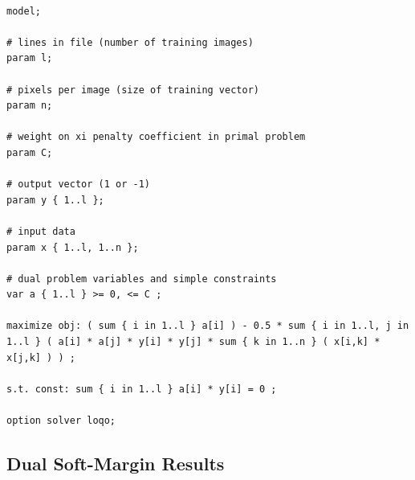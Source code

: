 \documentclass{article}
\begin{document}
\begin{verbatim}

model;

# lines in file (number of training images)
param l;

# pixels per image (size of training vector)
param n;

# weight on xi penalty coefficient in primal problem
param C;

# output vector (1 or -1)
param y { 1..l };

# input data
param x { 1..l, 1..n };

# dual problem variables and simple constraints
var a { 1..l } >= 0, <= C ;

maximize obj: ( sum { i in 1..l } a[i] ) - 0.5 * sum { i in 1..l, j in 1..l } ( a[i] * a[j] * y[i] * y[j] * sum { k in 1..n } ( x[i,k] * x[j,k] ) ) ;

s.t. const: sum { i in 1..l } a[i] * y[i] = 0 ;

option solver loqo;

\end{verbatim}

\subsection{Dual Soft-Margin Results}
\end{document}
